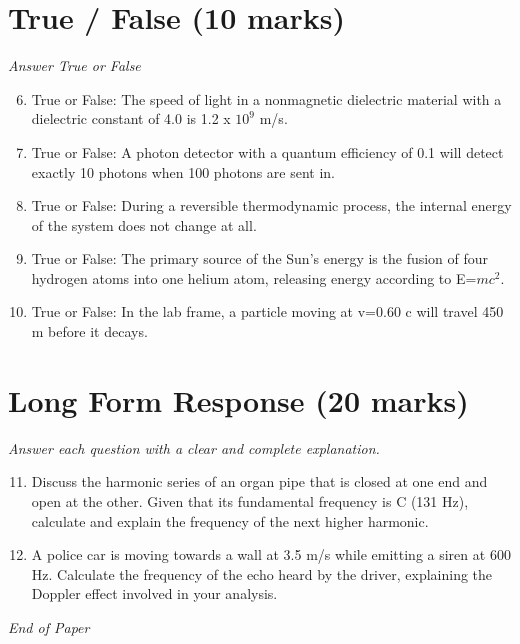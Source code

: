 \documentclass[12pt]{article}
\begin{document}
\section*{True / False (10 marks)}
\textit{Answer True or False}
\begin{enumerate}[label=\arabic*.]
\setcounter{enumi}{5}
\item True or False: The speed of light in a nonmagnetic dielectric material with a dielectric constant of 4.0 is 1.2 x $10^9$ m/s.
\item True or False: A photon detector with a quantum efficiency of 0.1 will detect exactly 10 photons when 100 photons are sent in.
\item True or False: During a reversible thermodynamic process, the internal energy of the system does not change at all.
\item True or False: The primary source of the Sun's energy is the fusion of four hydrogen atoms into one helium atom, releasing energy according to E=$mc^2$.
\item True or False: In the lab frame, a particle moving at v=0.60 c will travel 450 m before it decays.
\end{enumerate}

\section*{Long Form Response (20 marks)}
\textit{Answer each question with a clear and complete explanation.}
\begin{enumerate}[label=\arabic*.]
\setcounter{enumi}{10}
\item Discuss the harmonic series of an organ pipe that is closed at one end and open at the other. Given that its fundamental frequency is C (131 Hz), calculate and explain the frequency of the next higher harmonic.
\item A police car is moving towards a wall at 3.5 m/s while emitting a siren at 600 Hz. Calculate the frequency of the echo heard by the driver, explaining the Doppler effect involved in your analysis.
\end{enumerate}

\vfill
\noindent\textit{End of Paper}
\end{document}
